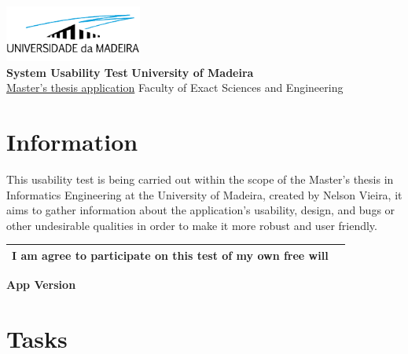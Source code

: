\documentclass[12pt,a4paper]{article}
\date{}
\begin{document}
\noindent
\hfill \includegraphics[width=4.5cm]{assets/images/uma_logo.png} \\
\large
\textbf{System Usability Test} \hfill \textbf{University of Madeira} \\
\normalsize
\hyperlink{project_link}{Master's thesis application} \hfill Faculty of Exact Sciences and Engineering \\

\section*{Information}

This usability test is being carried out within the scope of the Master's thesis
in Informatics Engineering at the University of Madeira, created by Nelson Vieira,
it aims to gather information about the application's usability, design, and bugs
or other undesirable qualities in order to make it more robust and user friendly.

\vspace{1cm}

\begin{tabular}{|m{10cm}|m{1cm}|}
    \hline
    I am agree to participate on this test of my own free will & \\
    \hline
\end{tabular}

\vspace{1cm}

\textbf{App Version}

\clearpage

\section*{Tasks}
\end{document}
